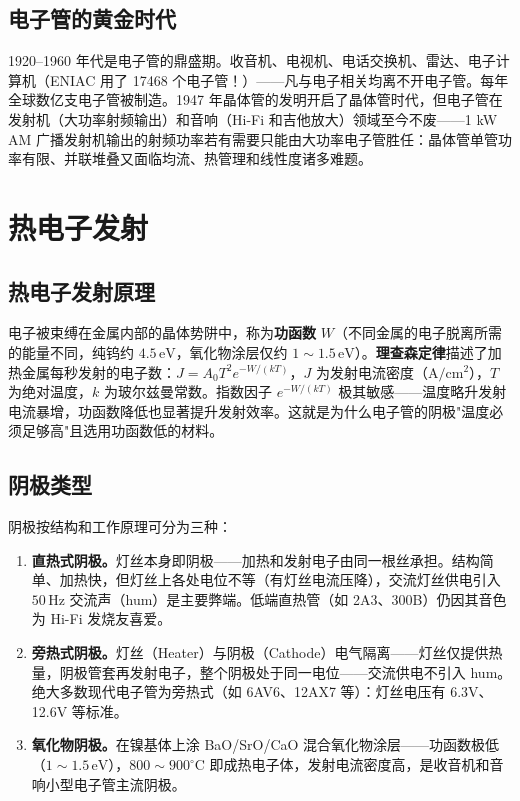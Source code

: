 \documentclass[12pt,UTF8]{ctexbook}
\begin{document}
\subsection{电子管的黄金时代}

1920–1960 年代是电子管的鼎盛期。收音机、电视机、电话交换机、雷达、电子计算机（ENIAC 用了 17468 个电子管！）——凡与电子相关均离不开电子管。每年全球数亿支电子管被制造。1947 年晶体管的发明开启了晶体管时代，但电子管在发射机（大功率射频输出）和音响（Hi-Fi 和吉他放大）领域至今不废——1 kW AM 广播发射机输出的射频功率若有需要只能由大功率电子管胜任：晶体管单管功率有限、并联堆叠又面临均流、热管理和线性度诸多难题。

\section{热电子发射}
\label{sec:thermionic_emission}

\subsection{热电子发射原理}

电子被束缚在金属内部的晶体势阱中，称为\textbf{功函数} $W$（不同金属的电子脱离所需的能量不同，纯钨约 $4.5\,\mathrm{eV}$，氧化物涂层仅约 $1\sim1.5\,\mathrm{eV}$）。\textbf{理查森定律}描述了加热金属每秒发射的电子数：$J = A_0 T^2 e^{-W/(kT)}$，$J$ 为发射电流密度（$\mathrm{A/cm^2}$），$T$ 为绝对温度，$k$ 为玻尔兹曼常数。指数因子 $e^{-W/(kT)}$ 极其敏感——温度略升发射电流暴增，功函数降低也显著提升发射效率。这就是为什么电子管的阴极"温度必须足够高"且选用功函数低的材料。

\subsection{阴极类型}

阴极按结构和工作原理可分为三种：
\begin{enumerate}
\item \textbf{直热式阴极。}灯丝本身即阴极——加热和发射电子由同一根丝承担。结构简单、加热快，但灯丝上各处电位不等（有灯丝电流压降），交流灯丝供电引入 $50\,\mathrm{Hz}$ 交流声（hum）是主要弊端。低端直热管（如 2A3、300B）仍因其音色为 Hi-Fi 发烧友喜爱。
\item \textbf{旁热式阴极。}灯丝（Heater）与阴极（Cathode）电气隔离——灯丝仅提供热量，阴极管套再发射电子，整个阴极处于同一电位——交流供电不引入 hum。绝大多数现代电子管为旁热式（如 6AV6、12AX7 等）：灯丝电压有 6.3V、12.6V 等标准。
\item \textbf{氧化物阴极。}在镍基体上涂 BaO/SrO/CaO 混合氧化物涂层——功函数极低（$1\sim1.5\,\mathrm{eV}$），$800\sim900^\circ\mathrm{C}$ 即成热电子体，发射电流密度高，是收音机和音响小型电子管主流阴极。
\end{enumerate}
\end{document}
